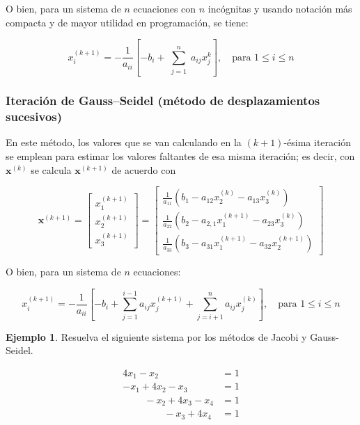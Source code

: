 \documentclass[12pt,letterpaper]{article}
\theoremstyle{definition}
\newtheorem{ejemplo}{Ejemplo}[section]
\theoremstyle{plain}
\theoremstyle{remark}
\begin{document}
O bien, para un sistema de $n$ ecuaciones con $n$ incógnitas y usando notación más compacta y de mayor utilidad en programación, se tiene:

\begin{equation}
x_i^{(k+1)} = -\frac{1}{a_{ii}} \left[ -b_i + \sum_{\substack{j=1}}^{n} a_{ij} x_j^{k} \right], \quad \text{para } 1 \leq i \leq n
\label{eq:3.90}
\tag{10}
\end{equation}

\subsubsection{Iteración de Gauss–Seidel (método de desplazamientos sucesivos)}

En este método, los valores que se van calculando en la $(k+1)$-ésima iteración se emplean para estimar los valores faltantes de esa misma iteración; es decir, con $\mathbf{x}^{(k)}$ se calcula $\mathbf{x}^{(k+1)}$ de acuerdo con

\begin{equation}
\mathbf{x}^{(k+1)} = 
\begin{bmatrix}
x_1^{(k+1)} \\
x_2^{(k+1)} \\
x_3^{(k+1)}
\end{bmatrix}
=
\begin{bmatrix}
\frac{1}{a_{11}} (b_1 - a_{12} x_2^{(k)} - a_{13} x_3^{(k)}) \\
\frac{1}{a_{22}} (b_2 - a_{2,1} x_1^{(k+1)} - a_{23} x_3^{(k)}) \\
\frac{1}{a_{33}} (b_3 - a_{31} x_1^{(k+1)} - a_{32} x_2^{(k+1)})
\end{bmatrix}
\label{eq:3.91}
\tag{11}
\end{equation}

O bien, para un sistema de $n$ ecuaciones:

\begin{equation}
x_i^{(k+1)} = -\frac{1}{a_{ii}} \left[ -b_i + \sum_{j=1}^{i-1} a_{ij} x_j^{(k+1)} + \sum_{j=i+1}^{n} a_{ij} x_j^{(k)} \right], \quad \text{para } 1 \leq i \leq n
\label{eq:3.92}
\tag{12}
\end{equation}

\begin{ejemplo}
Resuelva el siguiente sistema por los métodos de Jacobi y Gauss-Seidel.

\begin{equation}
\begin{aligned}
4x_1 - x_2 &= 1 \\
-x_1 + 4x_2 - x_3 &= 1 \\
\quad\quad\ -x_2 + 4x_3 - x_4 &= 1 \\
\quad\quad\quad\quad\ -x_3 + 4x_4 &= 1
\end{aligned}
\label{eq:3.93}
\tag{13}
\end{equation}
\end{ejemplo}
\end{document}
